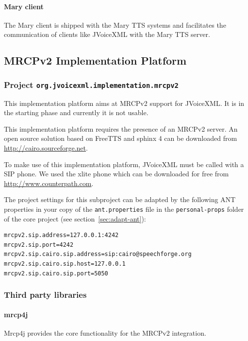 \documentclass[11pt,a4paper]{article}
\begin{document}
\paragraph{Mary client}

The Mary client is shipped with the Mary TTS systems and facilitates the
communication of clients like JVoiceXML with the Mary TTS server.

\subsection{MRCPv2 Implementation Platform}

\subsubsection{Project \texttt{org.jvoicexml.implementation.mrcpv2}}

This implementation platform aims at MRCPv2 support for JVoiceXML. It is in the
starting phase and currently it is not usable.

This implementation platform requires the presence of an MRCPv2 server. An open
source solution based on FreeTTS and sphinx 4 can be downloaded from
\url{http://cairo.sourceforge.net}.

To make use of this implementation platform, JVoiceXML must be called with a SIP
phone. We used the xlite phone which can be downloaded for free from
\url{http://www.counterpath.com}.

The project settings for this subproject can be adapted by the following ANT
properties in your copy of the \texttt{ant.properties} file in the
\texttt{personal-props} folder of the core project (see 
section~\ref{sec:adapt-ant}):
\begin{lstlisting}
mrcpv2.sip.address=127.0.0.1:4242
mrcpv2.sip.port=4242
mrcpv2.sip.cairo.sip.address=sip:cairo@speechforge.org
mrcpv2.sip.cairo.sip.host=127.0.0.1
mrcpv2.sip.cairo.sip.port=5050
\end{lstlisting}

\subsubsection{Third party libraries}
\label{sec:mrcpv2-third-party-libr}

\paragraph{mrcp4j}

Mrcp4j provides the core functionality for the MRCPv2 integration.
\end{document}
